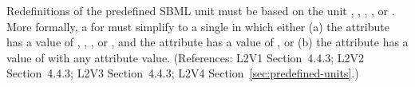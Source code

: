 Redefinitions of the predefined SBML unit  must be based on the
unit , , , , or
.  More formally, a \UnitDefinition for
 must simplify to a single \Unit in which either
(a) the  attribute has a value of ,
, , or , and the 
attribute has a value of , or (b) the  attribute has a
value of  with any  attribute value.
(References: L2V1 Section~4.4.3; L2V2 Section~4.4.3; L2V3
Section~4.4.3; L2V4 Section~\ref{sec:predefined-units}.)
